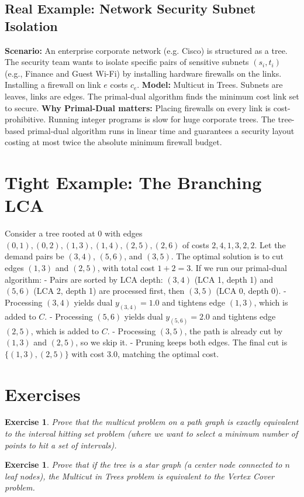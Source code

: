 \documentclass[11pt,oneside]{book}
\newtheorem{exercise}[theorem]{Exercise}
\begin{document}
\subsection*{Real Example: Network Security Subnet Isolation}
\textbf{Scenario:} An enterprise corporate network (e.g. Cisco) is structured as a tree. The security team wants to isolate specific pairs of sensitive subnets $(s_i, t_i)$ (e.g., Finance and Guest Wi-Fi) by installing hardware firewalls on the links. Installing a firewall on link $e$ costs $c_e$.
\textbf{Model:} Multicut in Trees. Subnets are leaves, links are edges. The primal-dual algorithm finds the minimum cost link set to secure.
\textbf{Why Primal-Dual matters:} Placing firewalls on every link is cost-prohibitive. Running integer programs is slow for huge corporate trees. The tree-based primal-dual algorithm runs in linear time and guarantees a security layout costing at most twice the absolute minimum firewall budget.

\section{Tight Example: The Branching LCA}
Consider a tree rooted at 0 with edges $(0, 1), (0, 2), (1, 3), (1, 4), (2, 5), (2, 6)$ of costs $2, 4, 1, 3, 2, 2$. Let the demand pairs be $(3, 4)$, $(5, 6)$, and $(3, 5)$.
The optimal solution is to cut edges $(1, 3)$ and $(2, 5)$, with total cost $1 + 2 = 3$.
If we run our primal-dual algorithm:
- Pairs are sorted by LCA depth: $(3, 4)$ (LCA 1, depth 1) and $(5, 6)$ (LCA 2, depth 1) are processed first, then $(3, 5)$ (LCA 0, depth 0).
- Processing $(3, 4)$ yields dual $y_{(3,4)} = 1.0$ and tightens edge $(1, 3)$, which is added to $C$.
- Processing $(5, 6)$ yields dual $y_{(5,6)} = 2.0$ and tightens edge $(2, 5)$, which is added to $C$.
- Processing $(3, 5)$, the path is already cut by $(1, 3)$ and $(2, 5)$, so we skip it.
- Pruning keeps both edges. The final cut is $\{(1, 3), (2, 5)\}$ with cost 3.0, matching the optimal cost.

\section{Exercises}
\begin{exercise}
Prove that the multicut problem on a path graph is exactly equivalent to the interval hitting set problem (where we want to select a minimum number of points to hit a set of intervals).
\end{exercise}
\begin{exercise}
Prove that if the tree is a star graph (a center node connected to $n$ leaf nodes), the Multicut in Trees problem is equivalent to the Vertex Cover problem.
\end{exercise}
\end{document}
